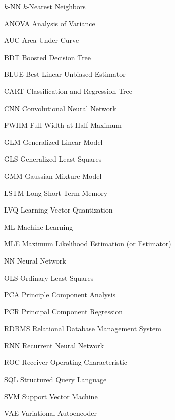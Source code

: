 \begin{symbollist}
	\item[$k$-NN] $k$-Nearest Neighbors
	\item[ANOVA] Analysis of Variance
	\item[AUC] Area Under Curve
	\item[BDT] Boosted Decision Tree
	\item[BLUE] Best Linear Unbiased Estimator
	\item[CART] Classification and Regression Tree
	\item[CNN] Convolutional Neural Network
	\item[FWHM] Full Width at Half Maximum
	\item[GLM] Generalized Linear Model
	\item[GLS] Generalized Least Squares
	\item[GMM] Gaussian Mixture Model
	\item[LSTM] Long Short Term Memory
	\item[LVQ] Learning Vector Quantization
	\item[ML] Machine Learning
	\item[MLE] Maximum Likelihood Estimation (or Estimator)
	\item[NN] Neural Network
	\item[OLS] Ordinary Least Squares
	\item[PCA] Principle Component Analysis
	\item[PCR] Principal Component Regression
	\item[RDBMS] Relational Database Management System
	\item[RNN] Recurrent Neural Network
	\item[ROC] Receiver Operating Characteristic
	\item[SQL] Structured Query Language
	\item[SVM] Support Vector Machine
	\item[VAE] Variational Autoencoder
\end{symbollist}
